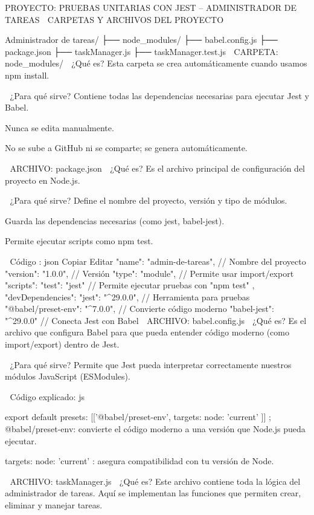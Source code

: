 PROYECTO: PRUEBAS UNITARIAS CON JEST – ADMINISTRADOR DE TAREAS
📁 CARPETAS Y ARCHIVOS DEL PROYECTO


Administrador de tareas/
├── node_modules/
├── babel.config.js
├── package.json
├── taskManager.js
├── taskManager.test.js
📁 CARPETA: node_modules/
📌 ¿Qué es?
Esta carpeta se crea automáticamente cuando usamos npm install.

🧠 ¿Para qué sirve?
Contiene todas las dependencias necesarias para ejecutar Jest y Babel.

Nunca se edita manualmente.

No se sube a GitHub ni se comparte; se genera automáticamente.

📄 ARCHIVO: package.json
📌 ¿Qué es?
Es el archivo principal de configuración del proyecto en Node.js.

🧠 ¿Para qué sirve?
Define el nombre del proyecto, versión y tipo de módulos.

Guarda las dependencias necesarias (como jest, babel-jest).

Permite ejecutar scripts como npm test.

📄 Código :
json
Copiar
Editar
{
  "name": "admin-de-tareas",              // Nombre del proyecto
  "version": "1.0.0",                      // Versión
  "type": "module",                        // Permite usar import/export
  "scripts": {
    "test": "jest"                         // Permite ejecutar pruebas con "npm test"
  },
  "devDependencies": {
    "jest": "^29.0.0",                     // Herramienta para pruebas
    "@babel/preset-env": "^7.0.0",         // Convierte código moderno
    "babel-jest": "^29.0.0"                // Conecta Jest con Babel
  }
}
📄 ARCHIVO: babel.config.js
📌 ¿Qué es?
Es el archivo que configura Babel para que pueda entender código moderno (como import/export) dentro de Jest.

🧠 ¿Para qué sirve?
Permite que Jest pueda interpretar correctamente nuestros módulos JavaScript (ESModules).

📄 Código explicado:
js

export default {
  presets: [['@babel/preset-env', { targets: { node: 'current' } }]]
};
@babel/preset-env: convierte el código moderno a una versión que Node.js pueda ejecutar.

targets: { node: 'current' }: asegura compatibilidad con tu versión de Node.

📄 ARCHIVO: taskManager.js
📌 ¿Qué es?
Este archivo contiene toda la lógica del administrador de tareas. Aquí se implementan las funciones que permiten crear, eliminar y manejar tareas.

